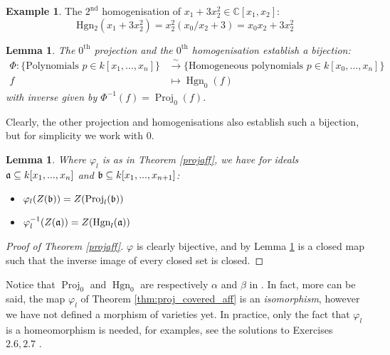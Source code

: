\documentclass[12pt]{article}
\theoremstyle{plain}
\newtheorem{lemma}[thm]{Lemma}
\theoremstyle{definition}
\newtheorem{example}[thm]{Example}
\newcommand{\bb}[1]{\mathbb{#1}}
\newcommand{\lto}{\longrightarrow}
\begin{document}
%
\begin{example}
The $2^{\text{nd}}$ homogenisation of $x_1 + 3x_2^2 \in \bb{C}[x_1,x_2]$:
\begin{equation}
    \operatorname{Hgn_2}(x_1 + 3x_2^2) = x_2^2(x_0/x_2 + 3) = x_0x_2 + 3x_2^2
\end{equation}
\end{example}
\begin{lemma}\label{lem:poly_homog_bij}
The $0^{\text{th}}$ projection and the $0^{\text{th}}$ homogenisation establish a bijection:
\begin{align}
    \Phi: \lbrace \text{Polynomials }p \in k[x_1,...,x_n]\rbrace &\stackrel{\sim}{\lto} \lbrace \text{Homogeneous polynomials }p \in k[x_0,...,x_{n}]\rbrace\\
    f &\longmapsto \operatorname{Hgn}_0(f)
\end{align}
with inverse given by $\Phi^{-1}(f) = \operatorname{Proj}_0(f)$.
\end{lemma}
Clearly, the other projection and homogenisations also establish such a bijection, but for simplicity we work with $0$.
\begin{lemma}
\label{closedsets}
Where $\varphi_l$ is as in Theorem \ref{projaff}, we have for ideals $\frak{a} \subseteq k[x_1,...,x_n]$ and $\frak{b} \subseteq k[x_1,...,x_{n+1}]$:
\begin{itemize}
    \item $\varphi_l(Z(\frak{b})) = Z(\operatorname{Proj}_l(\frak{b}))$
    \item $\varphi_l^{-1}(Z(\frak{a})) = Z(\operatorname{Hgn}_l(\frak{a}))$
\end{itemize}
\end{lemma}
\begin{proof}[Proof of Theorem \ref{projaff}]
$\varphi$ is clearly bijective, and by Lemma \ref{closedsets} is a closed map such that the inverse image of every closed set is closed.
\end{proof}
Notice that $\operatorname{Proj}_0$ and $\operatorname{Hgn}_0$ are respectively $\alpha$ and $\beta$ in \cite[\S 1 Prop 2.2]{hartshorne}. In fact, more can be said, the map $\varphi_l$ of Theorem \ref{thm:proj_covered_aff} is an \emph{isomorphism}, however we have not defined a morphism of varieties yet. In practice, only the fact that $\varphi_l$ is a homeomorphism is needed, for examples, see the solutions to Exercises $2.6,2.7$ \cite{hartshorne_solutions}.
%
%
%
%
%
%
\end{document}
